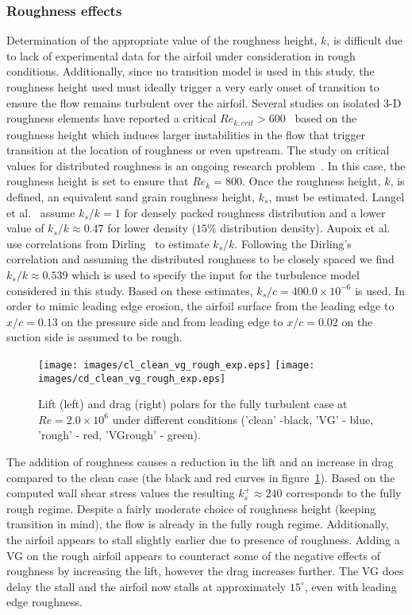 \subsubsection{Roughness effects}
Determination of the appropriate value of the roughness height, $k$, is difficult due to lack of experimental data for the airfoil under consideration in rough conditions. Additionally, since no transition model is used in this study, the roughness height used must ideally trigger a very early onset of transition to ensure the flow remains turbulent over the airfoil. Several studies on isolated 3-D roughness elements have reported a critical $Re_{k,crit} > 600$~\cite{ref:langel2014} based on the roughness height which induces larger instabilities in the flow that trigger transition at the location of roughness or even upstream. The study on critical values for distributed roughness is an ongoing research problem~\cite{ref:langel2014}. In this case, the roughness height is set to ensure that $Re_k=800$. Once the roughness height, $k$, is defined, an equivalent sand grain roughness height, $k_s$, must be estimated. Langel et al.~\cite{ref:langel2015} assume $k_s/k = 1$ for densely packed roughness distribution and a lower value of $k_s/k \approx 0.47$ for lower density ($15\%$ distribution density). Aupoix et al.~\cite{SAroughorig} use correlations from Dirling~\cite{dirling1973method} to estimate $k_s/k$. Following the Dirling's correlation and assuming the distributed roughness to be closely spaced we find $k_s/k \approx 0.539$ which is used to specify the input for the turbulence model considered in this study. Based on these estimates, $k_s/c = 400.0\times10^{-6}$ is used. In order to mimic leading edge erosion, the airfoil surface from the leading edge to $x/c=0.13$ on the pressure side and from leading edge to $x/c=0.02$ on the suction side is assumed to be rough.

\begin{figure}[h]
    \centering
    \captionsetup{justification=centering}
    \texttt{[image: images/cl\_clean\_vg\_rough\_exp.eps]}
    \texttt{[image: images/cd\_clean\_vg\_rough\_exp.eps]} 
    \caption{Lift (left) and drag (right) polars for the fully turbulent case at $Re=2.0\times10^6$ under different conditions ('clean' -black, 'VG' - blue, 'rough' - red, 'VGrough' - green).}
   \label{fig:vgroughpolar}
\end{figure}

The addition of roughness causes a reduction in the lift and an increase in drag compared to the clean case (the black and red curves in figure~\ref{fig:vgroughpolar}). Based on the computed wall shear stress values the resulting $k_s^+\approx 240$ corresponds to the fully rough regime. Despite a fairly moderate choice of roughness height (keeping transition in mind), the flow is already in the fully rough regime. Additionally, the airfoil appears to stall slightly earlier due to presence of roughness. Adding a VG on the rough airfoil appears to counteract some of the negative effects of roughness by increasing the lift, however the drag increases further. The VG does delay the stall and the airfoil now stalls at approximately $15^{\circ}$, even with leading edge roughness. 

